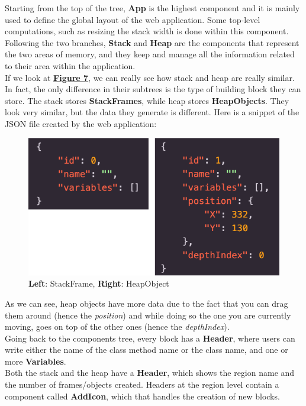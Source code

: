 \documentclass[]{usiinfbachelorproject}
\begin{document}
\pagebreak

\noindent Starting from the top of the tree, \textbf{App} is the highest component and it is mainly used to define the global layout of the web application. Some top-level computations, such as resizing the stack width is done within this component.\\
Following the two branches, \textbf{Stack} and \textbf{Heap} are the components that represent the two areas of memory, and they keep and manage all the information related to their area within the application.\\
If we look at \textbf{\hyperref[tree]{Figure 7}}, we can really see how stack and heap are really similar. In fact, the only difference in their subtrees is the type of building block they can store. The stack stores \textbf{StackFrames}, while heap stores \textbf{HeapObjects}. They look very similar, but the data they generate is different. Here is a snippet of the JSON file created by the web application:\\

\begin{figure}[h!]
\centering
\includegraphics[scale=.3]{figures/blocks_data.png}
\caption {\textbf{Left}: StackFrame, \textbf{Right}: HeapObject}
\label{tree}
\end{figure}

\noindent As we can see, heap objects have more data due to the fact that you can drag them around (hence the \emph{position}) and while doing so the one you are currently moving, goes on top of the other ones (hence the \emph{depthIndex}).\\
Going back to the components tree, every block has a \textbf{Header}, where users can write either the name of the class method name or the class name, and one or more \textbf{Variables}.\\
Both the stack and the heap have a \textbf{Header}, which shows the region name and the number of frames/objects created. Headers at the region level contain a component called \textbf{AddIcon}, which that handles the creation of new blocks.\\
\end{document}
